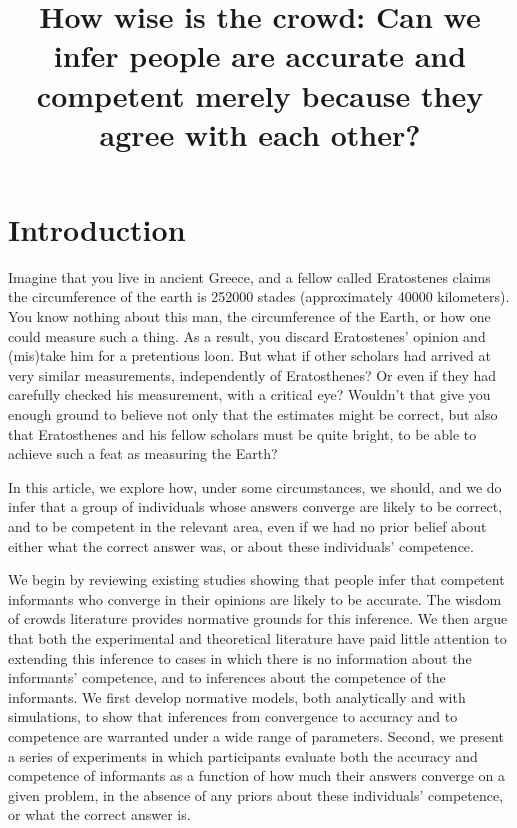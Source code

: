 \documentclass[
  doc,floatsintext]{apa6}
\title{How wise is the crowd: Can we infer people are accurate and competent merely because they agree with each other?}
\author{\phantom{0}}
\date{}
\affiliation{\vspace{0.5cm}\textsuperscript{} }
\begin{document}
\maketitle

\section{Introduction}\label{introduction}

Imagine that you live in ancient Greece, and a fellow called Eratostenes claims the circumference of the earth is 252000 stades (approximately 40000 kilometers). You know nothing about this man, the circumference of the Earth, or how one could measure such a thing. As a result, you discard Eratostenes' opinion and (mis)take him for a pretentious loon. But what if other scholars had arrived at very similar measurements, independently of Eratosthenes? Or even if they had carefully checked his measurement, with a critical eye? Wouldn't that give you enough ground to believe not only that the estimates might be correct, but also that Eratosthenes and his fellow scholars must be quite bright, to be able to achieve such a feat as measuring the Earth?

In this article, we explore how, under some circumstances, we should, and we do infer that a group of individuals whose answers converge are likely to be correct, and to be competent in the relevant area, even if we had no prior belief about either what the correct answer was, or about these individuals' competence.

We begin by reviewing existing studies showing that people infer that competent informants who converge in their opinions are likely to be accurate. The wisdom of crowds literature provides normative grounds for this inference. We then argue that both the experimental and theoretical literature have paid little attention to extending this inference to cases in which there is no information about the informants' competence, and to inferences about the competence of the informants. We first develop normative models, both analytically and with simulations, to show that inferences from convergence to accuracy and to competence are warranted under a wide range of parameters. Second, we present a series of experiments in which participants evaluate both the accuracy and competence of informants as a function of how much their answers converge on a given problem, in the absence of any priors about these individuals' competence, or what the correct answer is.
\end{document}

